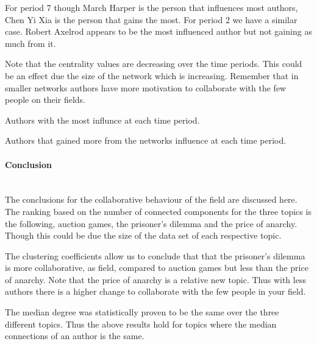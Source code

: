 \documentclass{article}
\begin{document}
For period 7 though March Harper is the person that influences most authors,
Chen Yi Xia is the person that gains the most. For period 2 we have a similar
case. Robert Axelrod appears to be the most influenced author but not gaining 
as much from it.

Note that the centrality values are decreasing over the time periods. This could
be an effect due the size of the network which is increasing. Remember that
in smaller networks authors have more motivation to collaborate with the 
few people on their fields.

\begin{table}[!hbtp]
    \begin{center}
    \scalebox{0.8}{
    }
    \caption{Authors with the most influnce at each time period.}
    \label{table:cc_over_time}
    \end{center}
\end{table}

\begin{table}[!hbtp]
    \begin{center}
    \scalebox{0.8}{
    }
    \caption{Authors that gained more from the networks influence at each
    time period.}
    \label{table:bc_over_time}
    \end{center}
\end{table}

\paragraph{Conclusion}
\mbox{ }\\

The conclusions for the collaborative behaviour of the field are discussed here.
The ranking based on the number of connected components for the three topics
is the following, auction games, the prisoner's dilemma and the price of anarchy.
Though this could be due the size of the data set of each respective topic.

The clustering coefficients allow us to conclude that that the prisoner's dilemma
is more collaborative, as field, compared to auction games but less than the 
price of anarchy. Note that the price of anarchy is a relative new topic. Thus
with less authors there is a higher change to collaborate with the few people
in your field.

The median degree was statistically proven to be the same over the three different
topics. Thus the above results hold for topics where the median connections
of an author is the same.
\end{document}
